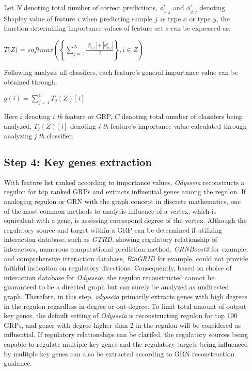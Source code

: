 \documentclass[fleqn,10pt]{wlscirep}
\begin{document}
Let $N$ denoting total number of correct predictions, $\phi_{x,j}^{i}$ and $\phi_{y,j}^{i}$ denoting Shapley value of feature $i$ when predicting sample $j$ as type $x$ or type $y$, the function determining importance values of feature set $z$ can be expressed as:

\centerline{$\textit{T(Z) = softmax}(\left\{\sum_{j = 1}^{N}\frac{\left|\phi_{x,j}^{i}\right| + \left|\phi_{y,j}^{i}\right|}{2}\right\}, i \in Z)$}

Following analysis all classifers, each feature's general importance value can be obtained through:

\centerline{$g(i) = \sum_{j = 1}^{C}T_{j}(Z)[i]$}

Here $i$ denoting \emph{i th} feature or GRP, $C$ denoting total number of classifers being analyzed, $T_{j}(Z)[i]$ denoting \emph{i th} feature's importance value calculated through analyzing \emph{j th} classifier.

\subsection*{Step 4: Key genes extraction}
\label{step4}
With feature list ranked according to importance values, \emph{Odysseia} reconstructs a regulon for top ranked GRPs and extracts influential genes among the regulon.
If analoging regulon or GRN with the graph concept in discrete mathematics, one of the most common methods to analysis influence of a vertex, which is equivalent with a gene, is assessing correspond degree of the vertex.
Although the regulatory source and target within a GRP can be determined if utilizing interaction database, such as \emph{GTRD}\cite{gkaa1057}, showing regulatory relationship of interactors, numerous computational prediction method, \emph{GRNBoost2}\cite{grnboost2} for example, and comprehensive interaction database, \emph{BioGRID}\cite{biogrid} for example, could not provide faithful indication on regulatory directions.
Consequently, based on choice of interaction database for \emph{Odysseia}, the regulon reconstructed cannot be guaranteed to be a directed graph but can surely be analyzed as undirected graph.
Therefore, in this step, \emph{odysseia} primarily extracts genes with high degrees in the regulon regardless in-degree or out-degree.
To limit total amount of output key genes, the default setting of \emph{Odysseia} is reconstructing regulon for top 100 GRPs, and genes with degree higher than 2 in the regulon will be considered as influential.
If regulatory relationships can be clarifed, the regulatory sources being capable to regulate multiple key genes and the regulatory targets being influenced by mulitple key genes can also be extracted according to GRN reconstruction guidance.
\end{document}
